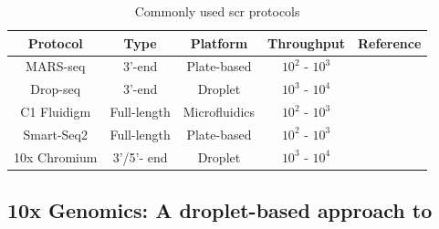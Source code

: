 \begin{table}[t]
\renewcommand{\arraystretch}{1.2} %
\centering
  \caption[Commonly used \gls{scr} protocols]{Commonly used \gls{scr} protocols}
  \label{tab:chp1_scprotocols}
  \begin{tabularx}{\textwidth}{C C C C C}
    \hline
    \textbf{Protocol} & \textbf{Type} & \textbf{Platform} & \textbf{Throughput} & \textbf{Reference} \\
    \hline
    MARS-seq & 3'-end & Plate-based & $10^2$ - $10^3$ & \textbf{\cite{jaitin_massively_2014}} \\
    \hline
    Drop-seq & 3'-end & Droplet & $10^3$ - $10^4$ & \textbf{\cite{macosko_highly_2015}} \\
    \hline
    C1 Fluidigm & Full-length & Microfluidics & $10^2$ - $10^3$ & \textbf{\cite{pollen_low-coverage_2014}} \\
    \hline
    Smart-Seq2 & Full-length & Plate-based & $10^2$ - $10^3$ & \textbf{\cite{picelli_smart-seq2_2013}} \\
    \hline
    10x Chromium & 3'/5'- end & Droplet & $10^3$ - $10^4$ & \textbf{\cite{zheng_massively_2017}} \\
    \hline
    
    
  \end{tabularx}

\end{table}


\subsection[10x Genomics: A droplet-based approach to \glsentryshort{scr}]{10x Genomics: A droplet-based approach to }
\label{sec:scrna_10x}

